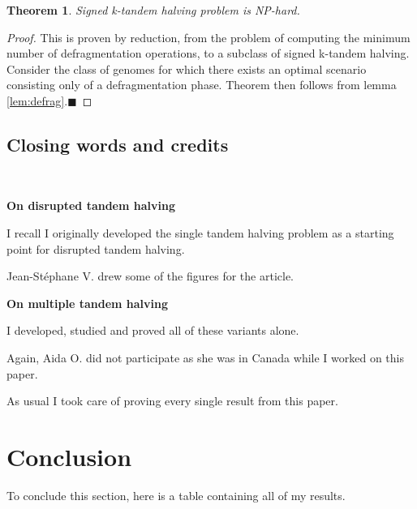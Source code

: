 \documentclass[11pt,final,twoside,nofrench]{thlifl}
\newcommand{\qed}{\ensuremath{\blacksquare}}
\newtheorem{proof}{Proof}
\newtheorem{theorem}{Theorem}
\begin{document}
\begin{theorem}
Signed k-tandem halving problem is NP-hard.
\end{theorem}

\begin{proof}
This is proven by reduction, from the problem of computing the minimum number of defragmentation operations, to a subclass of signed k-tandem halving.
Consider the class of genomes for which there exists an optimal scenario consisting only of a defragmentation phase. Theorem then follows from lemma \ref{lem:defrag}.\qed
\end{proof}

\subsection{Closing words and credits}

~

\textbf{On disrupted tandem halving}

I recall I originally developed the single tandem halving problem as a starting point for disrupted tandem halving.

Jean-Stéphane V. drew some of the figures for the article.

\textbf{On multiple tandem halving}

I developed, studied and proved all of these variants alone.

Again, Aida O. did not participate as she was in Canada while I worked on this paper.

As usual I took care of proving every single result from this paper. 

\section{Conclusion}

To conclude this section, here is a table containing all of my results.

\begin{center} 
\end{center}
\end{document}

